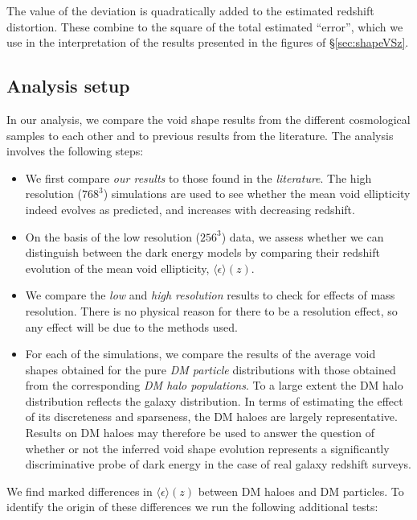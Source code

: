 The value of the deviation is quadratically added to the estimated redshift distortion. These combine to the square 
of the total estimated ``error'', which we use in the interpretation of the results presented in the figures of 
\S\ref{sec:shapeVSz}.

\subsection{Analysis setup}
\label{sec:analysis_setup}
In our analysis, we compare the void shape results from the different cosmological samples to each other and to previous results 
from the literature. The analysis involves the following steps:

\begin{itemize}
\item We first compare \textit{our results} to those found in the \textit{literature}. The high 
resolution ($768^3$) simulations are used to see whether the mean void ellipticity indeed 
evolves as predicted, and increases with decreasing redshift. 

\item On the basis of the low resolution ($256^3$) data, we assess whether we can distinguish 
between the dark energy models by comparing their redshift evolution of the mean void 
ellipticity, $\langle\epsilon\rangle(z)$.

\item We compare the \textit{low} and \textit{high resolution} results to check for effects of 
mass resolution. There is no physical reason for there to be a resolution effect, so any effect 
will be due to the methods used.

\item For each of the simulations, we compare the results of the average void shapes obtained for the 
pure \textit{DM particle} distributions with those obtained from the corresponding \textit{DM halo populations}.  
To a large extent the DM halo distribution reflects the galaxy distribution. In terms of estimating 
the effect of its discreteness and sparseness, the DM haloes are largely representative. Results on DM haloes 
may therefore be used to answer the question of whether or not the inferred void shape evolution 
represents a significantly discriminative probe of dark energy in the case of real galaxy redshift 
surveys. 
\end{itemize}
We find marked differences in $\langle\epsilon\rangle(z)$ between DM haloes and DM particles.
To identify the origin of these differences we run the following additional tests:

